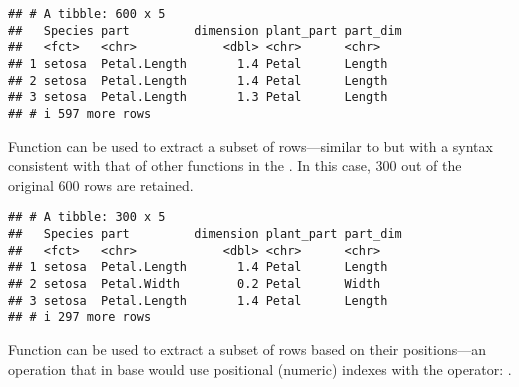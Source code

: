 \documentclass[krantz2]{krantz}\usepackage{knitr}
\begin{document}
\begin{knitrout}\footnotesize
{}\color{fgcolor}\begin{kframe}
\begin{alltt}
\end{alltt}
\begin{verbatim}
## # A tibble: 600 x 5
##   Species part         dimension plant_part part_dim
##   <fct>   <chr>            <dbl> <chr>      <chr>   
## 1 setosa  Petal.Length       1.4 Petal      Length  
## 2 setosa  Petal.Length       1.4 Petal      Length  
## 3 setosa  Petal.Length       1.3 Petal      Length  
## # i 597 more rows
\end{verbatim}
\end{kframe}
\end{knitrout}

Function  can be used to extract a subset of rows---similar to  but with a syntax consistent with that of other functions in the . In this case, 300 out of the original 600 rows are retained.

\begin{knitrout}\footnotesize
{}\color{fgcolor}\begin{kframe}
\begin{alltt}
 \hlopt{==} \hlstd{)}
\end{alltt}
\begin{verbatim}
## # A tibble: 300 x 5
##   Species part         dimension plant_part part_dim
##   <fct>   <chr>            <dbl> <chr>      <chr>   
## 1 setosa  Petal.Length       1.4 Petal      Length  
## 2 setosa  Petal.Width        0.2 Petal      Width   
## 3 setosa  Petal.Length       1.4 Petal      Length  
## # i 297 more rows
\end{verbatim}
\end{kframe}
\end{knitrout}

Function  can be used to extract a subset of rows based on their positions---an operation that in base \Rlang would use positional (numeric) indexes with the \code{[ , ]} operator: .
\end{document}
